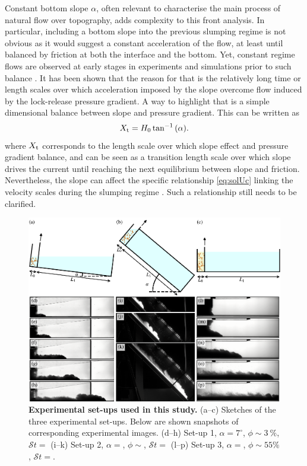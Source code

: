 \documentclass[twocolumn]{article}
\begin{document}
Constant bottom slope $\alpha$, often relevant to characterise the main process of natural flow over topography, adds complexity to this front analysis. In particular, including a bottom slope into the previous slumping regime is not obvious as it would suggest a constant acceleration of the flow, at least until balanced by friction at both the interface and the bottom. Yet, constant regime flows are observed at early stages in experiments and simulations prior to such balance \citep{Birman2007,???}. It has been shown that the reason for that is the relatively long time or length scales over which acceleration imposed by the slope overcome flow induced by the lock-release pressure gradient. A way to highlight that is a simple dimensional balance between slope and pressure gradient. This can be written as
\begin{equation}
	\label{eq:Xt_slope}
	X_{\rm t}=H_0\tan^{-1}{(\alpha)}.
\end{equation}
where $X_{\rm t}$ corresponds to the length scale over which slope effect and pressure gradient balance, and can be seen as a transition length scale over which slope drives the current until reaching the next equilibrium between slope and friction.
Nevertheless, the slope can affect the specific relationship \eqref{eq:solUc} linking the velocity scales during the slumping regime \citep{Birman2007,???}. Such a relationship still needs to be clarified.

\begin{figure}[ht!]
	\centering
	\includegraphics{figure1.pdf}
	\caption{\textbf{Experimental set-ups used in this study.} (a--c) Sketches of the three experimental set-ups. Below are shown snapshots of corresponding experimental images. (d--h) Set-up 1, $\alpha = 7^\circ$, $\phi \sim 3~\%$, $\mathcal{S}t=$ (i--k) Set-up 2, $\alpha = $, $\phi \sim $, $\mathcal{S}t=$ (l--p) Set-up 3, $\alpha = $, $\phi \sim 55\%$, $\mathcal{S}t=$.}
	\label{fig:fig1}
\end{figure}
\end{document}
